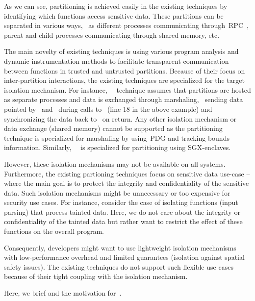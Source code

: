 As we can see, partitioning is achieved easily in the existing techniques by identifying which functions access sensitive data.
These partitions can be separated in various ways,~\eg{} as different processes communicating through~\ac{RPC}~\cite{nelson1981remote}, parent and child processes communicating through shared memory, etc.

The main novelty of existing techniques is using various program analysis and dynamic instrumentation methods to facilitate transparent communication between functions in trusted and untrusted partitions.
Because of their focus on inter-partition interactions, the existing techniques are specialized for the target isolation mechanism. For instance,~\ptrsplit{}~\cite{liu2017ptrsplit} technique assumes that partitions are hosted as separate processes and data is exchanged through marshaling,~\eg{} sending data pointed by~ and~ during calls to~ (\ie line 18 in the above example) and synchronizing the data back to~ on return.
Any other isolation mechanism or data exchange (\eg shared memory) cannot be supported as the partitioning technique is specialized for marshaling by using~\ac{PDG} and tracking bounds information.
Similarly,~\glamdring~\cite{lind2017glamdring} is specialized for partitioning using SGX-enclaves.

However, these isolation mechanisms may not be available on all systems.
Furthermore, the existing partioning techniques focus on sensitive data use-case -- where the main goal is to protect the integrity and confidentiality of the sensitive data.
Such isolation mechanisms might be unnecessary or too expensive for security use cases.
For instance, consider the case of isolating functions (\eg input parsing) that process tainted data. 
Here, we do not care about the integrity or confidentiality of the tainted data but rather want to restrict the effect of these functions on the overall program.

Consequently, developers might want to use lightweight isolation mechanisms with low-performance overhead and limited guarantees (\eg isolation against spatial safety issues).
The existing techniques do not support such flexible use cases because of their tight coupling with the isolation mechanism.



Here, we brief \checkedc and the motivation for~\systemname{}.

